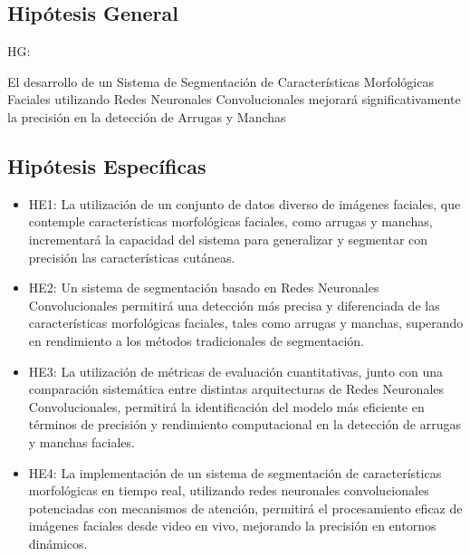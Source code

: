 \subsection{Hipótesis General}
HG: \newcommand{\HipotesisGeneral}{
El desarrollo de un Sistema de Segmentación de Características Morfológicas Faciales utilizando Redes Neuronales Convolucionales mejorará significativamente la precisión en la detección de Arrugas y Manchas}
\HipotesisGeneral


\subsection{Hipótesis Específicas}
\newcommand{\Hone}{
La utilización de un conjunto de datos diverso de imágenes faciales, que contemple características morfológicas faciales, como arrugas y manchas, incrementará la capacidad del sistema para generalizar y segmentar con precisión las características cutáneas.
}
\newcommand{\Htwo}{
Un sistema de segmentación basado en Redes Neuronales Convolucionales permitirá una detección más precisa y diferenciada de las características morfológicas faciales, tales como arrugas y manchas, superando en rendimiento a los métodos tradicionales de segmentación.
}
\newcommand{\Hthree}{
La utilización de métricas de evaluación cuantitativas, junto con una comparación sistemática entre distintas arquitecturas de Redes Neuronales Convolucionales, permitirá la identificación del modelo más eficiente en términos de precisión y rendimiento computacional en la detección de arrugas y manchas faciales.
}
\newcommand{\Hfour}{
La implementación de un sistema de segmentación de características morfológicas en tiempo real, utilizando redes neuronales convolucionales potenciadas con mecanismos de atención, permitirá el procesamiento eficaz de imágenes faciales desde video en vivo, mejorando la precisión en entornos dinámicos.
}

\begin{itemize}
	\item HE1: {\Hone}
	\item HE2: {\Htwo}
	\item HE3: {\Hthree}
	\item HE4: {\Hfour}
\end{itemize}